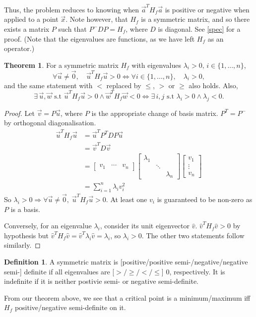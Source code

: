 \documentclass{article}
\theoremstyle{definition}
\newtheorem{thm}{Theorem}[subsubsection]
\newtheorem{defn}{Definition}[subsubsection]
\begin{document}
Thus, the problem reduces to knowing when $\vec a^T H_f\vec a$ is positive or negative when applied to a point $\vec x$. Note however, that $H_f$ is a symmetric matrix, and so there exists a matrix $P$ such that $P^-DP=H_f$, where $D$ is diagonal. See \ref{spec} for a proof. (Note that the eigenvalues are functions, as we have left $H_f$ as an operator.)
\begin{thm}
	For a symmetric matrix $H_f$ with eigenvalues $\lambda_i>0,\,i\in\{1,...,n\}$,
	\[\forall\vec{u}\not=\vec{0},\quad\vec{u}^TH_f\vec{u}>0\iff\forall i\in\{1,...,n\},\quad\lambda_i>0,\]
	and the same statement with $<$ replaced by $\leq$, $>$ or $\geq$ also holds.
	Also, \[\exists\,\vec{u},\vec{w}\text{ s.t }\vec{u}^TH_f\vec{u}>0\land\vec{w}^TH_f\vec{w}<0\iff\exists\,i,j\text{ s.t }\lambda_i>0\land\lambda_j<0.\]
\end{thm}
\begin{proof}
	Let $\vec{v}=P\vec{u}$, where $P$ is the appropriate change of basis matrix. $P^T=P^-$ by orthogonal diagonalisation.
	\begin{align*}
		\vec{u}^TH_f\vec{u}&=\vec{u}^TP^{T}DP\vec{u}\\
		&=\vec{v}^TD\vec{v}\\
		&=\begin{bmatrix}v_1&\cdots&v_n\end{bmatrix}\begin{bmatrix}\lambda_1&&\\&\ddots&\\&&\lambda_n\end{bmatrix}\begin{bmatrix}v_1\\\vdots\\v_n\end{bmatrix}\\
		&=\sum_{i=1}^n\lambda_iv_i^2
	\end{align*}
	So $\lambda_i>0\Rightarrow\forall\vec{u}\not=\vec{0},\;\vec{u}^TH_f\vec{u}>0$. At least one $v_i$ is guaranteed to be non-zero as $P$ is a basis.\par
	
	Conversely, for an eigenvalue $\lambda_i$, consider its unit eigenvector $\hat v$. $\hat v^TH_f\hat v>0$ by hypothesis but $\hat v^TH_f\hat v=\hat v^T\lambda_i\hat v=\lambda_i$, so $\lambda_i>0$. The other two statements follow similarly.
\end{proof}
\begin{defn}
	A symmetric matrix is [positive/positive semi-/negative/negative semi-] definite if all eigenvalues are [$>/\geq/</\leq$] 0, respectively. It is indefinite if it is neither postivie semi- or negative semi-definite.
\end{defn}
From our theorem above, we see that a critical point is a minimum/maximum iff $H_f$ positive/negative semi-definite on it.\par
\end{document}
